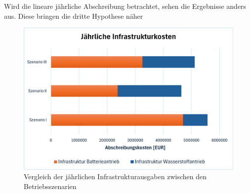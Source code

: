 Wird die lineare jährliche Abschreibung betrachtet, sehen die Ergebnisse anders aus. Diese bringen die dritte Hypothese näher
\begin{figure}[h]
	\centering
	\includegraphics[width=0.8\linewidth]{Bilder/infr_abschreibung.png}
	\caption[Vergleich der jährlichen Infrastrukturausgaben zwischen den Betriebsszenarien]{Vergleich der jährlichen Infrastrukturausgaben zwischen den Betriebsszenarien}
	\label{res_betriebsszenarien}
\end{figure}
